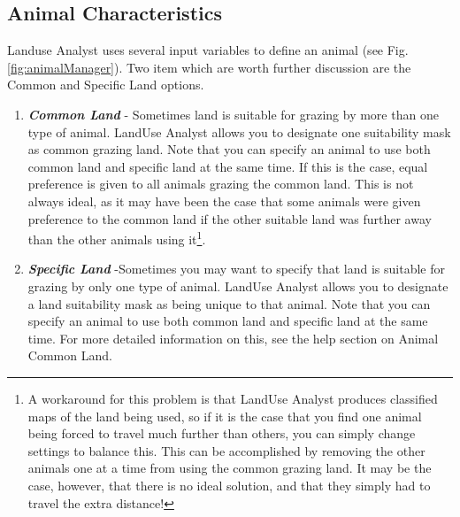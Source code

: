   \subsection{Animal Characteristics}
  Landuse Analyst uses several input variables  to define an animal (see Fig. \ref{fig:animalManager}).
Two item which are worth further discussion are the Common and Specific Land options.
      \begin{enumerate}
        \item \textit{\textbf{Common Land}} - Sometimes land is suitable for
grazing by more than one type of animal. LandUse Analyst allows you to designate
one suitability mask as common grazing land. Note that you can specify an animal
to use both common land and specific land at the same time. If this is the case,
equal preference is given to all animals grazing the common land. This is not
always ideal, as it may have been the case that some animals were given
preference to the common land if the other suitable land was further away than
the other animals using it\footnote{A workaround for this problem is that
LandUse Analyst produces classified maps of the land being used, so if it is the
case that you find one animal being forced to travel much further than others,
you can simply change settings to balance this. This can be accomplished by
removing the other animals one at a time from using the common grazing land. It
may be the case, however, that there is no ideal solution, and that they simply
had to travel the extra distance!}.
        \item \textit{\textbf{Specific Land}} -Sometimes you may want to specify
that land is suitable for grazing by only one type of animal. LandUse Analyst
allows you to designate a land suitability mask as being unique to that animal.
Note that you can specify an animal to use both common land and specific land at
the same time. For more detailed information on this, see the help section on
Animal Common Land.   
\end{enumerate}

